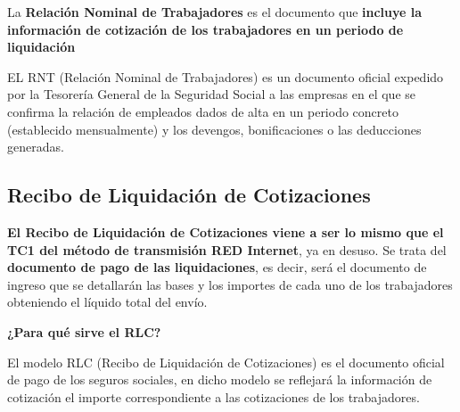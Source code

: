 \documentclass{article}
\begin{document}
	La \textbf{Relación Nominal de Trabajadores} es el documento que \textbf{incluye la información de cotización de los trabajadores en un periodo de liquidación}
	
	EL RNT (Relación Nominal de Trabajadores) es un documento oficial expedido por la Tesorería General de la Seguridad Social a las empresas en el que se confirma la relación de empleados dados de alta en un periodo concreto (establecido mensualmente) y los devengos, bonificaciones o las deducciones generadas.
	
	\subsection*{Recibo de Liquidación de Cotizaciones}
	
	\textbf{El Recibo de Liquidación de Cotizaciones viene a ser lo mismo que el TC1 del método de transmisión RED Internet}, ya en desuso. Se trata del \textbf{documento de pago de las liquidaciones}, es decir, será el documento de ingreso que se detallarán las bases y los importes de cada uno de los trabajadores obteniendo el líquido total del envío.
	
	\textbf{¿Para qué sirve el RLC?}
	
	El modelo RLC (Recibo de Liquidación de Cotizaciones) es el documento oficial de pago de los seguros sociales, en dicho modelo se reflejará la información de cotización el importe correspondiente a las cotizaciones de los trabajadores.
	
\end{document}
